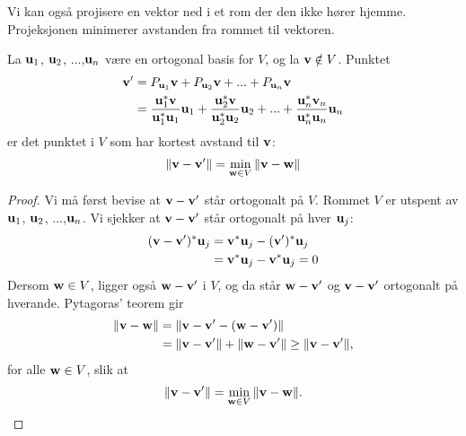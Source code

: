 Vi kan også projisere en vektor ned i et rom der den ikke hører hjemme. 
Projeksjonen minimerer avstanden fra rommet til vektoren.
\begin{thm}
La $\mathbf{u}_1$, $\mathbf{u} _2$, ...,$\mathbf{u}_n$ være en ortogonal basis for $V$, og la $\mathbf{v} \notin V$. Punktet
\begin{align*}
\mathbf{v}'&= P_{\mathbf{u}_1} \mathbf{v} + P_{\mathbf{u}_2} \mathbf{v} + ... +P_{\mathbf{u}_n} \mathbf{v}\\ &= \frac{\mathbf{u}_1^*\mathbf{v}}{\mathbf{u}_1^*\mathbf{u}_1}\mathbf{u}_1 + \frac{\mathbf{u}_2^*\mathbf{v}}{\mathbf{u}_2^*\mathbf{u}_2}\mathbf{u}_2+...+\frac{\mathbf{u}_n^*\mathbf{v}_n}{\mathbf{u}_n^*\mathbf{u}_n}\mathbf{u}_n
\end{align*}
er det punktet i $V$ som har kortest avstand til $\mathbf{v}$:
\[
\|\mathbf{v}-\mathbf{v}' \|=\min_{\mathbf{w} \in V} \|\mathbf{v}-\mathbf{w} \|
\]
\end{thm}
\begin{proof}
Vi må først bevise at $\mathbf{v}-\mathbf{v}'$ står ortogonalt på $V$. 
Rommet $V$ er utspent av $\mathbf{u}_1$, $\mathbf{u} _2$, ...,$\mathbf{u}_n$.
Vi sjekker at $\mathbf{v}-\mathbf{v}'$ står ortogonalt på hver $\mathbf{u}_j$:
\begin{align*}
(\mathbf{v}-\mathbf{v}')^*\mathbf{u}_j&=\mathbf{v}^*\mathbf{u}_j-(\mathbf{v}')^*\mathbf{u}_j \\ &=\mathbf{v}^*\mathbf{u}_j-\mathbf{v}^*\mathbf{u}_j =0
\end{align*}
Dersom $\mathbf{w} \in V$, ligger også $\mathbf{w}-\mathbf{v}'$ i $V$, og da står $\mathbf{w}-\mathbf{v}'$ og $\mathbf{v}-\mathbf{v}'$ ortogonalt på hverande. Pytagoras' teorem gir
\begin{align*}
\|\mathbf{v}-\mathbf{w} \|&=\|\mathbf{v}-\mathbf{v}'-(\mathbf{w}-\mathbf{v}') \|\\&= \|\mathbf{v}-\mathbf{v}' \| +\|\mathbf{w}-\mathbf{v}' \|  \geq  \|\mathbf{v}-\mathbf{v}' \|,
\end{align*}
for alle $\mathbf{w} \in V$, slik at 
\[
\|\mathbf{v}-\mathbf{v}' \|=\min_{\mathbf{w} \in V} \|\mathbf{v}-\mathbf{w} \|.\qedhere
\]
\end{proof}


